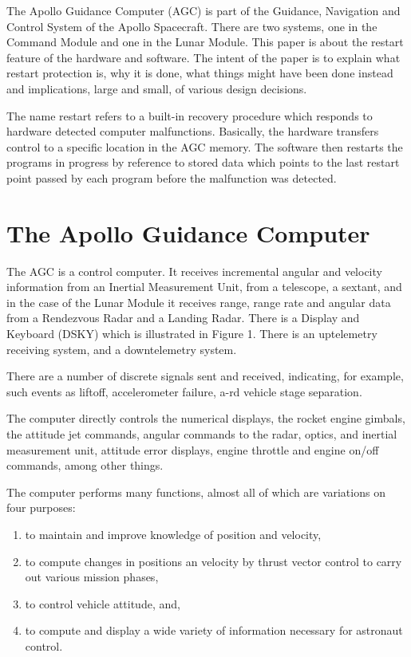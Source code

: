 \documentclass[oxford]{ahsan}
\begin{document}
The Apollo Guidance Computer (AGC) is part of the Guidance, Navigation and Control
System of the Apollo Spacecraft. There are two systems, one in the Command Module and
one in the Lunar Module. This paper is about the restart feature of the hardware and
software. The intent of the paper is to explain what restart protection is, why it is
done, what things might have been done instead and implications, large and small, of
various design decisions.

The name restart refers to a built-in recovery procedure which responds to hardware
detected computer malfunctions. Basically, the hardware transfers control to a specific
location in the AGC memory. The software then restarts the programs in progress by
reference to stored data which points to the last restart point passed by each program
before the malfunction was detected.


\section{The Apollo Guidance Computer}

The AGC is a control computer. It receives incremental angular and velocity information
from an Inertial Measurement Unit, from a telescope, a sextant, and in the case of the
Lunar Module it receives range, range rate and angular data from a Rendezvous Radar and
a Landing Radar. There is a Display and Keyboard (DSKY) which is illustrated in Figure
1. There is an uptelemetry receiving system, and a downtelemetry system.

There are a number of discrete signals sent and received, indicating, for example, such
events as liftoff, accelerometer failure, a-rd  vehicle stage separation.

The computer directly controls the numerical displays, the rocket engine gimbals, the
attitude jet commands, angular commands to the radar, optics, and inertial measurement
unit, attitude error displays, engine throttle and engine on/off commands, among other
things.

The computer performs many functions, almost all of which are variations on four
purposes:
\begin{enumerate}
    \item to maintain and improve knowledge of position and velocity,
    \item to compute changes in positions an velocity by thrust vector control to
        carry out various mission phases,
    \item to control vehicle attitude, and,
    \item to compute and display a wide variety of information necessary for astronaut
        control.
\end{enumerate}
\end{document}
